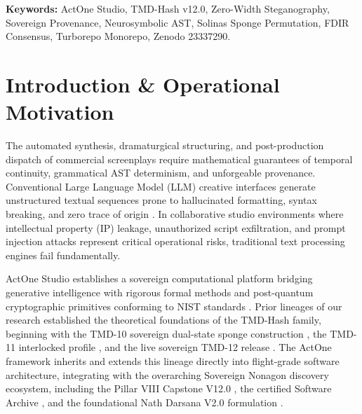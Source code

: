 \documentclass[11pt,a4paper,reqno]{article}
\theoremstyle{plain}
\theoremstyle{definition}
\theoremstyle{remark}
\numberwithin{equation}{section}
\begin{document}
\vspace{0.8em}
\noindent\textbf{Keywords:} ActOne Studio, TMD-Hash v12.0, Zero-Width Steganography, Sovereign Provenance, Neurosymbolic AST, Solinas Sponge Permutation, FDIR Consensus, Turborepo Monorepo, Zenodo 23337290.

\vspace{1.2em}

\section{\texorpdfstring{Introduction \& Operational Motivation}{Introduction and Operational Motivation}}
\label{sec:intro}

The automated synthesis, dramaturgical structuring, and post-production dispatch of commercial screenplays require mathematical guarantees of temporal continuity, grammatical AST determinism, and unforgeable provenance. Conventional Large Language Model (LLM) creative interfaces generate unstructured textual sequences prone to hallucinated formatting, syntax breaking, and zero trace of origin \cite{vaswani2017attention, fletcher2021screenplay}. In collaborative studio environments where intellectual property (IP) leakage, unauthorized script exfiltration, and prompt injection attacks represent critical operational risks, traditional text processing engines fail fundamentally.

ActOne Studio establishes a sovereign computational platform bridging generative intelligence with rigorous formal methods and post-quantum cryptographic primitives conforming to NIST standards \cite{fips1804, fips204}. Prior lineages of our research established the theoretical foundations of the TMD-Hash family, beginning with the TMD-10 sovereign dual-state sponge construction \cite{tmd10zenodo}, the TMD-11 interlocked profile \cite{tmd11zenodo}, and the live sovereign TMD-12 release \cite{tmd12zenodo}. The ActOne framework inherits and extends this lineage directly into flight-grade software architecture, integrating with the overarching Sovereign Nonagon discovery ecosystem, including the Pillar VIII Capstone V12.0 \cite{capstone12zenodo}, the certified Software Archive \cite{capstonesoftware12zenodo}, and the foundational Nath Darsana V2.0 formulation \cite{nathdarsana2zenodo, nathdarsanasw2zenodo}.
\end{document}
